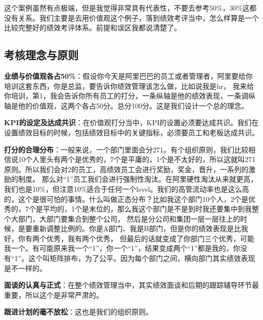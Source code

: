 \documentclass[12pt]{article}
\begin{document}
这个案例虽然有点极端，但是我觉得非常具有代表性，不要去参考50\%，30\%这都没有关系。我们主要是去用价值观这个例子，落到绩效考评当中，怎么样算是一个比较完整好的绩效考评体系。前提和误区我都说清楚了。

\subsection{考核理念与原则}
\textbf{业绩与价值观各占50\%}：假设你今天是阿里巴巴的员工或者管理者，阿里要给你培训这套东西，你是总监，要告诉你绩效管理该怎么做，比如说我是hr， 我来给你培训，第1，我会告诉你所有员工的打分，一条纵轴是他的绩效表现，一条调纵轴是他的价值观，这两个各占50分。总分100分。这是我们设计一个总的理念。

\textbf{KPI的设定及达成共识}：在价值观打分当中，KPI的设置必须要达成共识。我们在设置绩效目标的时候，包括绩效目标中的关键指标，必须要员工和老板达成共识。

\textbf{打分的合理分布}：一般来说，一个部门里面会分271。有个组织原则，我们比较相信说10个人里头有两个是优秀的，7个是平庸的，1个是不太好的，所以这就叫271原则。所以我们会对2的员工，高绩效员工会进行奖励，奖金，晋升，一系列的激励的制度。 那么对“1”员工我们会进行强制性淘汰。在阿里硬性淘汰从来就更高，我们也是10\%，但注意10\%适合于任何一个level。我们的高管流动率也是这么高的，这个是很可怕的事情。什么叫做正态分布？比如我这个部门10个人，2个是优秀的，7个是平均的，1个是末位的，那么我这个部门是不是到时我还要集中到我整个大部门，大部门要集合到整个公司， 然后是分公司和集团一层一层往上的时候，是要重新调整比例的。你是A部门、我是B部门，但是你的绩效表现是比我好，你有两个优秀，我有两个优秀， 但最后的话就变成了你部门三个优秀，可能我一个。有可能原来我一个“1”，你一个“1”，结果变成两个“1”都是我的，你没有“1”。这个叫矩阵排布，为了公平。因为每个部门之间，横向部门其实绩效表现是不一样的。

\textbf{面谈的认真与正式}：在整个绩效管理当中，其实绩效面谈和后期的跟踪辅导环节最重要，所以这个是非常严肃的。

\textbf{跟进计划的毫不放松}：这也是我们的组织原则。
\end{document}
